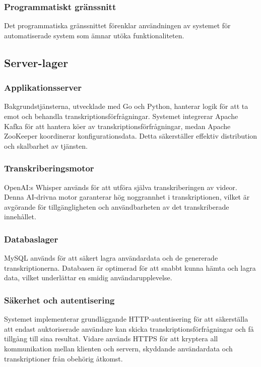 \subsubsection{Programmatiskt gränssnitt}
Det programmatiska gränssnittet förenklar användningen av systemet för
automatiserade system som ämnar utöka funktionaliteten. 

\subsection{Server-lager}

\subsubsection{Applikationsserver}
Bakgrundstjänsterna, utvecklade med Go och Python, hanterar logik för att ta
emot och behandla transkriptionsförfrågningar. Systemet integrerar Apache
Kafka för att hantera köer av transkriptionsförfrågningar, medan Apache
ZooKeeper koordinerar konfigurationsdata. Detta säkerställer effektiv
distribution och skalbarhet av tjänsten.

\subsubsection{Transkriberingsmotor}
OpenAI:s Whisper används för att utföra själva transkriberingen av videor.
Denna AI-drivna motor garanterar hög noggrannhet i transkriptionen, vilket är
avgörande för tillgängligheten och användbarheten av det transkriberade
innehållet.

\subsubsection{Databaslager}
MySQL används för att säkert lagra användardata och de genererade
transkriptionerna. Databasen är optimerad för att snabbt kunna hämta och lagra
data, vilket underlättar en smidig användarupplevelse.

\subsubsection{Säkerhet och autentisering}
Systemet implementerar grundläggande HTTP-autentisering för att säkerställa
att endast auktoriserade användare kan skicka transkriptionsförfrågningar och
få tillgång till sina resultat. Vidare används HTTPS för att kryptera all
kommunikation mellan klienten och servern, skyddande användardata och
transkriptioner från obehörig åtkomst.


